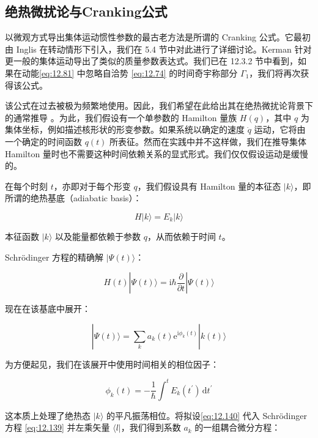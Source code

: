 \subsection{绝热微扰论与Cranking公式\label{subsec:12.3.7}}

以微观方式导出集体运动惯性参数的最古老方法是所谓的 Cranking 公式。它最初由 Inglis \cite{In54,In56}
在转动情形下引入，我们在 5.4 节中对此进行了详细讨论。Kerman \cite{Ke61} 针对更一般的集体运动导出了类似的质量参数表达式。我们已在
12.3.2 节中看到，如果在动能\ref{eq:12.81} 中忽略自洽势 \ref{eq:12.74} 的时间奇宇称部分 $\Gamma_{1}$，我们将再次获得该公式。

该公式在过去被极为频繁地使用。因此，我们希望在此给出其在绝热微扰论背景下的通常推导 \cite{Wi55,In56,Be61a,Th61a}。为此，我们假设有一个单参数的
Hamilton 量族 $H(q)$，其中 $q$ 为集体坐标，例如描述核形状的形变参数。如果系统以确定的速度 $\dot{q}$
运动，它将由一个确定的时间函数 $q(t)$ 所表征。然而在实践中并不这样做，我们在推导集体 Hamilton 量时也不需要这种时间依赖关系的显式形式。我们仅仅假设运动是缓慢的。

在每个时刻 $t$，亦即对于每个形变 $q$，我们假设具有 Hamilton 量的本征态 $|k\rangle$，即所谓的绝热基底（adiabatic
basis）\cite{No77}：

\begin{equation}
H|k\rangle=E_{k}|k\rangle\label{eq:12.138}
\end{equation}

本征函数 $|k\rangle$ 以及能量都依赖于参数 $q$，从而依赖于时间 $t$。

Schrödinger 方程的精确解 $|\Psi(t)\rangle$：

\begin{equation}
H(t)|\Psi(t)\rangle=\mathrm{i}\hbar\frac{\partial}{\partial t}|\Psi(t)\rangle\label{eq:12.139}
\end{equation}

现在在该基底中展开：

\begin{equation}
|\Psi(t)\rangle=\sum_{k}a_{k}(t)\mathrm{e}^{\mathrm{i}\phi_{k}(t)}|k(t)\rangle\label{eq:12.140}
\end{equation}

为方便起见，我们在该展开中使用时间相关的相位因子：

\begin{equation}
\phi_{k}(t)=-\frac{1}{\hbar}\int^{t}E_{k}(t^{\prime})\,\mathrm{d}t^{\prime}\label{eq:12.141}
\end{equation}

这本质上处理了绝热态 $|k\rangle$ 的平凡振荡相位。将拟设\ref{eq:12.140} 代入 Schrödinger
方程 \ref{eq:12.139} 并左乘矢量 $\langle l|$，我们得到系数 $a_{k}$ 的一组耦合微分方程：

